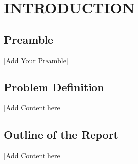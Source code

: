 \chapter{\centering \textbf{\MakeUppercase{INTRODUCTION}}}
\justifying
\section{Preamble}
[Add Your Preamble]

\section{Problem Definition}
[Add Content here]

\section{Outline of the Report}
[Add Content here]